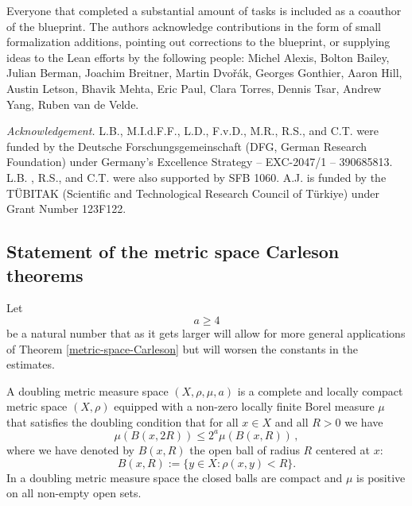 Everyone that completed a substantial amount of tasks is included as a coauthor of the blueprint.
The authors acknowledge contributions in the form of small formalization additions,
pointing out corrections to the blueprint,
or supplying ideas to the Lean efforts by the following people:
Michel Alexis,
Bolton Bailey,
Julian Berman,
Joachim Breitner,
Martin Dvořák,
Georges Gonthier,
Aaron Hill,
Austin Letson,
Bhavik Mehta,
Eric Paul,
Clara Torres,
Dennis Tsar,
Andrew Yang,
Ruben van de Velde.

\noindent \textit{Acknowledgement.}
L.B., M.I.d.F.F., L.D., F.v.D., M.R., R.S., and C.T. were funded by the Deutsche For\-schungs\-gemein\-schaft (DFG, German Research Foundation) under Germany's Excellence Strategy -- EXC-2047/1 -- 390685813.
L.B. , R.S., and C.T. were also supported by SFB 1060.
A.J. is funded by the T\"UBITAK (Scientific and Technological Research Council of T\"urkiye) under Grant Number 123F122.

\subsection{Statement of the metric space Carleson theorems}

Let
\begin{equation}
    a\ge 4
\end{equation}
be a natural number that as it gets larger will allow for more general applications of Theorem \ref{metric-space-Carleson}
but will worsen the constants in the estimates.


A doubling metric measure space $(X,\rho,\mu, a)$ is a complete
and locally compact metric space $(X,\rho)$
equipped with a non-zero locally finite Borel measure $\mu$ that satisfies the doubling condition that for all $x\in X$ and all $R>0$ we have
\begin{equation}\label{doublingx}
    \mu(B(x,2R))\le 2^a\mu(B(x,R))\,,
\end{equation}
where we have denoted by $B(x,R)$ the open ball of radius $R$ centered at $x$:
\begin{equation}\label{eq-define-ball}
 B(x,R):=\{y\in X: \rho(x,y)<R\}. \end{equation}
In a doubling metric measure space the closed balls are compact and $\mu$ is positive on all non-empty open sets.

